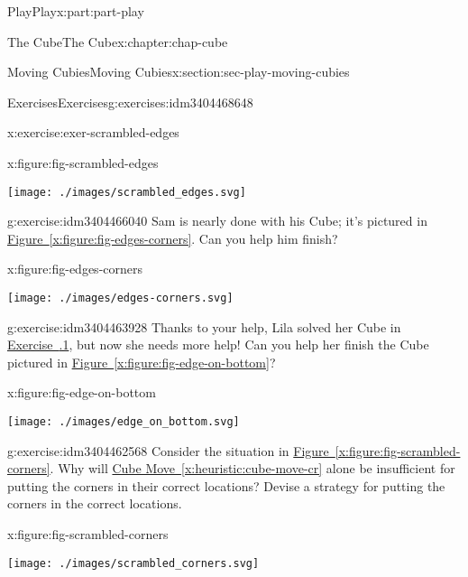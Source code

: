 \documentclass[oneside,10pt,]{book}
\newcommand{\xreffont}{\relax}
\numberwithin{equation}{section}
\begin{document}
\begin{partptx}{Play}{}{Play}{}{}{x:part:part-play}
\begin{chapterptx}{The Cube}{}{The Cube}{}{}{x:chapter:chap-cube}
\begin{sectionptx}{Moving Cubies}{}{Moving Cubies}{}{}{x:section:sec-play-moving-cubies}
\begin{exercises-subsection-numberless}{Exercises}{}{Exercises}{}{}{g:exercises:idm3404468648}
\begin{divisionexercise}{1}{}{}{x:exercise:exer-scrambled-edges}
\begin{figureptx}{}{x:figure:fig-scrambled-edges}{}%
\begin{image}{0.25}{0.5}{0.25}%
\texttt{[image: ./images/scrambled\_edges.svg]}
\end{image}%
\tcblower
\end{figureptx}%
\end{divisionexercise}%
\begin{divisionexercise}{2}{}{}{g:exercise:idm3404466040}%
Sam is nearly done with his Cube; it's pictured in \hyperref[x:figure:fig-edges-corners]{Figure~{\xreffont\ref{x:figure:fig-edges-corners}}}. Can you help him finish?%
\begin{figureptx}{}{x:figure:fig-edges-corners}{}%
\begin{image}{0.25}{0.5}{0.25}%
\texttt{[image: ./images/edges-corners.svg]}
\end{image}%
\tcblower
\end{figureptx}%
\end{divisionexercise}%
\begin{divisionexercise}{3}{}{}{g:exercise:idm3404463928}%
Thanks to your help, Lila solved her Cube in \hyperlink{x:exercise:exer-scrambled-edges}{Exercise~{\xreffont 1.3.1}}, but now she needs more help! Can you help her finish the Cube pictured in \hyperref[x:figure:fig-edge-on-bottom]{Figure~{\xreffont\ref{x:figure:fig-edge-on-bottom}}}?%
\begin{figureptx}{}{x:figure:fig-edge-on-bottom}{}%
\begin{image}{0.25}{0.5}{0.25}%
\texttt{[image: ./images/edge\_on\_bottom.svg]}
\end{image}%
\tcblower
\end{figureptx}%
\end{divisionexercise}%
\begin{divisionexercise}{4}{}{}{g:exercise:idm3404462568}%
Consider the situation in \hyperref[x:figure:fig-scrambled-corners]{Figure~{\xreffont\ref{x:figure:fig-scrambled-corners}}}. Why will \hyperref[x:heuristic:cube-move-cr]{Cube Move~{\xreffont\ref{x:heuristic:cube-move-cr}}} alone be insufficient for putting the corners in their correct locations? Devise a strategy for putting the corners in the correct locations.%
\begin{figureptx}{}{x:figure:fig-scrambled-corners}{}%
\begin{image}{0.25}{0.5}{0.25}%
\texttt{[image: ./images/scrambled\_corners.svg]}
\end{image}%

\end{figureptx}
\end{divisionexercise}
\end{exercises-subsection-numberless}
\end{sectionptx}
\end{chapterptx}
\end{partptx}
\end{document}
